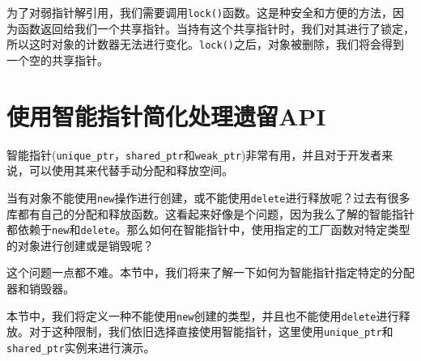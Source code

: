 为了对弱指针解引用，我们需要调用\texttt{lock()}函数。这是种安全和方便的方法，因为函数返回给我们一个共享指针。当持有这个共享指针时，我们对其进行了锁定，所以这时对象的计数器无法进行变化。\texttt{lock()}之后，对象被删除，我们将会得到一个空的共享指针。


\section{使用智能指针简化处理遗留API}

智能指针(\texttt{unique\_ptr}，\texttt{shared\_ptr}和\texttt{weak\_ptr})非常有用，并且对于开发者来说，可以使用其来代替手动分配和释放空间。

当有对象不能使用\texttt{new}操作进行创建，或不能使用\texttt{delete}进行释放呢？过去有很多库都有自己的分配和释放函数。这看起来好像是个问题，因为我么了解的智能指针都依赖于\texttt{new}和\texttt{delete}。那么如何在智能指针中，使用指定的工厂函数对特定类型的对象进行创建或是销毁呢？

这个问题一点都不难。本节中，我们将来了解一下如何为智能指针指定特定的分配器和销毁器。


本节中，我们将定义一种不能使用\texttt{new}创建的类型，并且也不能使用\texttt{delete}进行释放。对于这种限制，我们依旧选择直接使用智能指针，这里使用\texttt{unique\_ptr}和\texttt{shared\_ptr}实例来进行演示。

